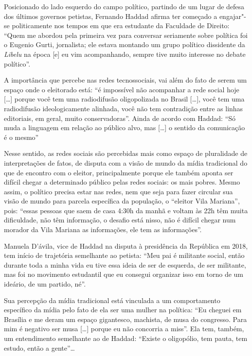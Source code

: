 Posicionado do lado esquerdo do campo político, partindo de um lugar de
defesa dos últimos governos petistas, Fernando Haddad afirma ter
começado a engajar"-se politicamente nos tempos em que era estudante da
Faculdade de Direito: ``Quem me abordou pela primeira vez para conversar
seriamente sobre política foi o Eugenio Gurti, jornalista; ele estava
montando um grupo político dissidente da \textit{Libelu} na época {[}e{]} eu
vim acompanhando, sempre tive muito interesse no debate político''.

A importância que percebe nas redes tecnossociais, vai além do fato de
serem um espaço onde o eleitorado está: ``é impossível não acompanhar a
rede social hoje {[}\ldots{}{]} porque você tem uma radiodifusão
oligopolizada no Brasil {[}\ldots{}{]}, você tem uma radiodifusão
ideologicamente alinhada, você não tem contradição entre as linhas
editoriais, em geral, muito conservadoras''. Ainda de acordo com Haddad:
``Só muda a linguagem em relação ao público alvo, mas {[}\ldots{}{]} o
sentido da comunicação é o mesmo''

Nesse sentido, as redes sociais são percebidas mais como espaço de
pluralidade de interpretações de fatos, de disputa com a visão de mundo
da mídia tradicional do que de encontro com o eleitor, principalmente
porque ele também aponta ser difícil chegar a determinado público pelas
redes sociais: os mais pobres. Mesmo assim, o político precisa estar nas
redes, nem que seja para fazer circular sua visão de mundo para parcela
específica da população, o ``eleitor Vila Mariana'', pois: ``essas
pessoas que saem de casa 4:30h da manhã e voltam às 22h têm muita
dificuldade, não têm informação, o desafio está nisso, não é difícil
chegar num morador da Vila Mariana as informações, ele tem as
informações''.

Manuela D'ávila, vice de Haddad na disputa à presidência da República em
2018, tem início de trajetória semelhante ao petista: ``Meu pai é
militante social, então durante toda a minha vida eu tive essa ideia de
ser de esquerda, de ser militante, mas foi no movimento estudantil que
eu consegui organizar isso em torno de um ideário, de um partido, né''.

Sua percepção da mídia tradicional está vinculada a um comportamento
específico da mídia pelo fato de ela ser uma mulher na política: ``Eu
cheguei em Brasília e me deram um espaço gigantesco, machista, de musa
do congresso. Para mim é negativo ser musa {[}\ldots{}{]} porque eu não
concorria a miss''. Ela tem, também, um entendimento semelhante ao de
Haddad: ``Existe o oligopólio, tem pauta, tem estudo, então a gente''\ldots{}

